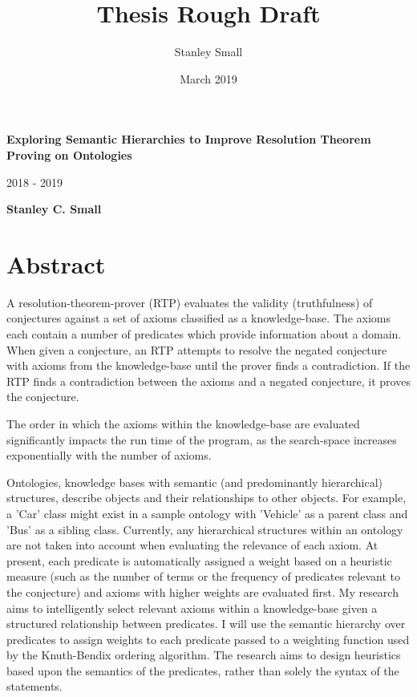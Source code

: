 \documentclass{article}
\title{Thesis Rough Draft}
\author{Stanley Small}
\date{March 2019}
\begin{document}
\begin{titlepage}
    \begin{center}
        \textbf{Exploring Semantic Hierarchies to Improve Resolution Theorem Proving on Ontologies}
        
        \vspace{0.5cm}
        2018 - 2019
        
        \vspace{1.5cm}
        \textbf{Stanley C. Small}
    \end{center}
\end{titlepage}

\tableofcontents

\newpage
\section{Abstract}
A resolution-theorem-prover (RTP) evaluates the validity (truthfulness) of conjectures against a set of axioms classified as a knowledge-base. The axioms each contain a number of predicates which provide information about a domain. When given a conjecture, an RTP attempts to resolve the negated conjecture with axioms from the knowledge-base until the prover finds a contradiction. If the RTP finds a contradiction between the axioms and a negated conjecture, it proves the conjecture. 

The order in which the axioms within the knowledge-base are evaluated significantly impacts the run time of the program, as the search-space increases exponentially with the number of axioms. 

Ontologies, knowledge bases with semantic (and predominantly hierarchical) structures, describe objects and their relationships to other objects. For example, a 'Car' class might exist in a sample ontology with 'Vehicle' as a parent class and 'Bus' as a sibling class. Currently, any hierarchical structures within an ontology are not taken into account when evaluating the relevance of each axiom. At present, each predicate is automatically assigned a weight based on a heuristic measure (such as the number of terms or the frequency of predicates relevant to the conjecture) and axioms with higher weights are evaluated first. My research aims to intelligently select relevant axioms within a knowledge-base given a structured relationship between predicates. I will use the semantic hierarchy over predicates to assign weights to each predicate passed to a weighting function used by the Knuth-Bendix ordering algorithm. The research aims to design heuristics based upon the semantics of the predicates, rather than solely the syntax of the statements. 
\end{document}
